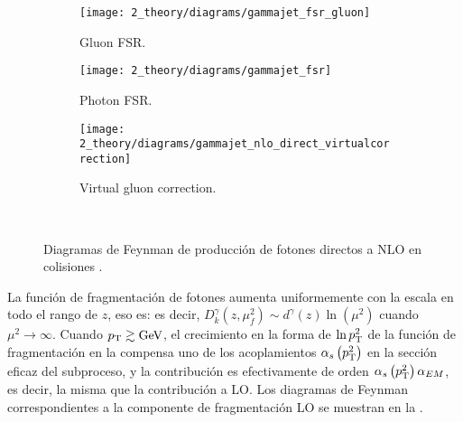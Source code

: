 \begin{figure}[ht!]
    \centering
    \begin{subfigure}[h]{0.32\linewidth}
        \centering
        \texttt{[image: 2\_theory/diagrams/gammajet\_fsr\_gluon]}
        \caption{Gluon \ac{FSR}.}
        \label{fig:theory:sm:prompt_photon:feynman_nlo_direct:gluon}
    \end{subfigure}
    \hfill
    \begin{subfigure}[h]{0.32\linewidth}
        \centering
        \texttt{[image: 2\_theory/diagrams/gammajet\_fsr]}
        \caption{Photon \ac{FSR}.}
        \label{fig:theory:sm:prompt_photon:feynman_nlo_direct:photon}
    \end{subfigure}
    \hfill
    \begin{subfigure}[h]{0.32\linewidth}
        \centering
        \texttt{[image: 2\_theory/diagrams/gammajet\_nlo\_direct\_virtualcorrection]}
        \caption{Virtual gluon correction.}
        \label{fig:theory:sm:prompt_photon:feynman_nlo_direct:gluon_virtual}
    \end{subfigure}\\
    \caption{Diagramas de Feynman de producci\'on de fotones directos a \ac{NLO} en colisiones \pp.}
    \label{fig:theory:sm:prompt_photon:feynman_nlo_direct}
\end{figure}


La función de fragmentación de fotones aumenta uniformemente con la escala en todo el rango de \(z\), eso es: es decir, \(D_k^{\gamma} \left(z, \mu_f^2\right) \sim d^{\gamma}(z)\ln(\mu^2)\) cuando \(\mu^2 \to \infty\). Cuando \(p_{\text{T}} \gtrsim \text{GeV}\), el crecimiento en la forma de \(\ln p_{\text{T}}^2\) de la función de fragmentación en la \Eqn{\ref{eq:theory:sm:prompt_photon:fragmentation_contribution}} compensa uno de los acoplamientos \(\alpha_s \left(p_{\text{T}}^2\right)\) en la sección eficaz del subproceso, y la contribución es efectivamente de orden \(\alpha_s \left(p_{\text{T}}^2\right) \alpha_{EM}\), es decir, la misma que la contribución a \ac{LO}. Los diagramas de Feynman correspondientes a la componente de fragmentación \ac{LO} se muestran en la \Fig{\ref{fig:theory:sm:prompt_photon:feynman_lo_frag}}.



